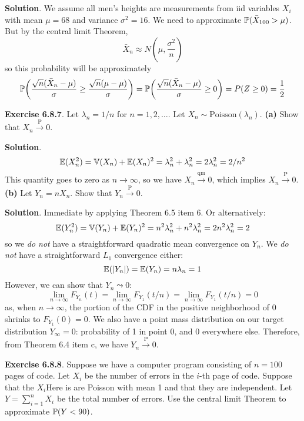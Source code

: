 \textbf{Solution}.
We assume all men's heights are measurements from iid variables \(X_{i}\)
with mean \(\mu = 68\) and variance \(\sigma^{2} = 16\).
We need to approximate \(\operatorname{\mathbb{P}}(\bar{X}_{100} > \mu)\). But by
the central limit Theorem,
\[
\bar{X}_{n} \approx N\left(\mu, \frac{\sigma^{2}}{n}\right)
\]
so this probability will be approximately
\[
\PROB\left(\frac{\sqrt{n}(\bar{X}_{n} - \mu)}{\sigma} \geq \frac{\sqrt{n}(\mu- \mu)}{\sigma}\right) = \PROB\left(\frac{\sqrt{n}(\bar{X}_{n} - \mu)}{\sigma} \geq 0 \right) = P(Z \geq 0) = \frac{1}{2}
\]

\textbf{Exercise 6.8.7}. Let \(\lambda_{n} = 1/n\) for
\(n = 1, 2, \dots\). Let \(X_{n} \sim \text{Poisson}(\lambda_{n})\).
\textbf{(a)} Show that \(X_{n} \xrightarrow{\textrm{P}} 0\).

\textbf{Solution}.
\[
\operatorname{\mathbb{E}}(X_{n}^{2}) = \operatorname{\mathbb{V}}(X_{n}) + \operatorname{\mathbb{E}}(X_{n})^{2}
= \lambda_{n}^{2} + \lambda_{n}^{2} = 2 \lambda_{n}^{2} = 2/n^{2}
\]
This quantity goes to zero as \(n \rightarrow \infty\), so we have
\(X_{n} \xrightarrow{\text{qm}} 0\), which implies
\(X_{n} \xrightarrow{\textrm{P}} 0\).
\textbf{(b)} Let \(Y_{n} = n X_{n}\). Show that
\(Y_{n} \xrightarrow{\textrm{P}} 0\).

\textbf{Solution}. Immediate by applying Theorem 6.5 item 6. Or
alternatively:
\[
\operatorname{\mathbb{E}}(Y_{n}^{2}) = \operatorname{\mathbb{V}}(Y_{n}) + \operatorname{\mathbb{E}}(Y_{n})^{2}
= n^{2} \lambda_{n}^{2} + n^{2}\lambda_{n}^{2} = 2 n^{2} \lambda_{n}^{2} = 2
\]
so we \emph{do not} have a straightforward quadratic mean convergence on
\(Y_{n}\).
We \emph{do not} have a straightforward \(L_{1}\) convergence either:
\[
\operatorname{\mathbb{E}}(|Y_{n}|) = \operatorname{\mathbb{E}}(Y_{n}) = n \lambda_{n} = 1
\]
However, we can show that \(Y_{n} \leadsto 0\):
\[
\lim _{n \rightarrow \infty} F_{Y_{n}}(t) = \lim _{n \rightarrow \infty} F_{Y_{1}}(t / n) = \lim _{n \rightarrow \infty} F_{Y_{1}}(t / n) = 0
\]
as, when \(n \rightarrow \infty\), the portion of the CDF in the
positive neighborhood of 0 shrinks to \(F_{Y_{1}}(0) = 0\).
We also have a point mass distribution on our target distribution
\(Y_{\infty} = 0\): probability of 1 in point 0, and 0 everywhere else.
Therefore, from Theorem 6.4 item c, we have
\(Y_{n} \xrightarrow{\textrm{P}} 0\).

\textbf{Exercise 6.8.8}. Suppose we have a computer program consisting
of \(n = 100\) pages of code. Let \(X_{i}\) be the number of errors in the
\(i\)-th page of code. Suppose that the \(X_{i}\)Here is are Poisson with mean
1 and that they are independent. Let \(Y = \sum_{i=1}^{n} X_{i}\) be the
total number of errors. Use the central limit Theorem to approximate
\(\operatorname{\mathbb{P}}(Y < 90)\).

